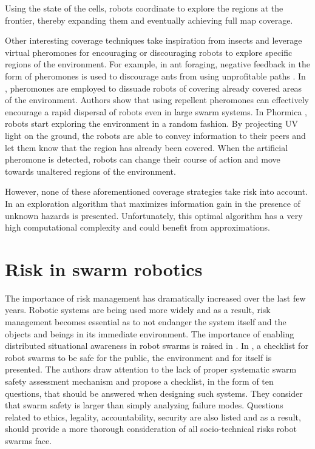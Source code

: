 Using the state of the cells, robots coordinate to explore the regions at the frontier, thereby expanding them and eventually achieving full map coverage.

Other interesting coverage techniques take inspiration from insects and leverage virtual pheromones for encouraging or discouraging robots to explore specific regions of the environment. For example, in ant foraging, negative feedback in the form of pheromones is used to discourage ants from using unprofitable paths \cite{robinson2005no}. In \cite{hunt2019testing}, pheromones are employed to dissuade robots of covering already covered areas of the environment. Authors show that using repellent pheromones can effectively encourage a rapid dispersal of robots even in large swarm systems. In Phormica \cite{salman2020phormica}, robots start exploring the environment in a random fashion. By projecting \ac{UV} light on the ground, the robots are able to convey information to their peers and let them know that the region has already been covered. When the artificial pheromone is detected, robots can change their course of action and move towards unaltered regions of the environment.

However, none of these aforementioned coverage strategies take
risk into account. In
\cite{dames2012decentralized,schwagerMultirobotControlPolicy2017}
an exploration algorithm that maximizes information gain in the presence of unknown hazards is presented. Unfortunately, this optimal algorithm has a
very high computational complexity and could benefit from approximations.



\section{Risk in swarm robotics}
The importance of risk management has dramatically increased over the last few years. Robotic systems are being used more widely and as a result, risk management becomes essential as to not endanger the system itself and the objects and beings in its immediate environment. The importance of enabling distributed situational awareness in robot swarms is raised in \cite{jones2020distributed}. In \cite{hunt2020checklist}, a checklist for robot swarms to be safe for the public, the environment and for itself is presented. The authors draw attention to the lack of proper systematic swarm safety assessment mechanism and propose a checklist, in the form of ten questions, that should be answered when designing such systems. They consider that swarm safety is larger than simply analyzing failure modes. Questions related to ethics, legality, accountability, security are also listed and as a result, should provide a more thorough consideration of all socio-technical risks robot swarms face. 

